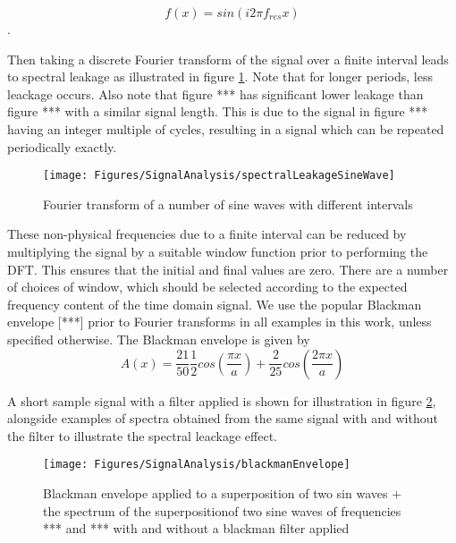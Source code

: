 $$
f(x) = sin(i2 \pi f_{res} x)
$$
.

Then taking a discrete Fourier transform of the signal over a finite interval leads to spectral leakage as illustrated in figure \ref{fig:signal-analysis-speactral-leakage-sine-wave}. Note that for longer periods, less leackage occurs. Also note that figure {***} has significant lower leakage than figure {***} with a similar signal length. This is due to the signal in figure {***} having an integer multiple of cycles, resulting in a signal which can be repeated periodically exactly.

\begin{figure}
\begin{center}
    \texttt{[image: Figures/SignalAnalysis/spectralLeakageSineWave]}
\end{center}
\caption{Fourier transform of a number of sine waves with different intervals}
\label{fig:signal-analysis-speactral-leakage-sine-wave}
\end{figure}


These non-physical frequencies due to a finite interval can be reduced by multiplying the signal by a suitable window function prior to performing the DFT. This ensures that the initial and final values are zero.
There are a number of choices of window, which should be selected according to the expected frequency content of the time domain signal.  We use the popular Blackman envelope [***] prior to Fourier transforms in all examples in this work, unless specified otherwise. The Blackman envelope is given by
$$
A(x) = \frac{21}{50} \frac{1}{2} cos ( \frac{\pi x}{a} ) + \frac{2}{25} cos ( \frac{2 \pi x }{a} ) 
$$

A short sample signal with a filter applied is shown for illustration in figure \ref{fig:signal-analysis-blackman-envelope}, alongside examples of spectra obtained from the same signal with and without the filter to illustrate the spectral leackage effect.

\begin{figure}
\begin{center}
    \texttt{[image: Figures/SignalAnalysis/blackmanEnvelope]}
\end{center}
\caption{Blackman envelope applied to a superposition of two sin waves + the spectrum of the superpositionof two sine waves of frequencies *** and *** with and without a blackman filter applied }
\label{fig:signal-analysis-blackman-envelope}
\end{figure}

